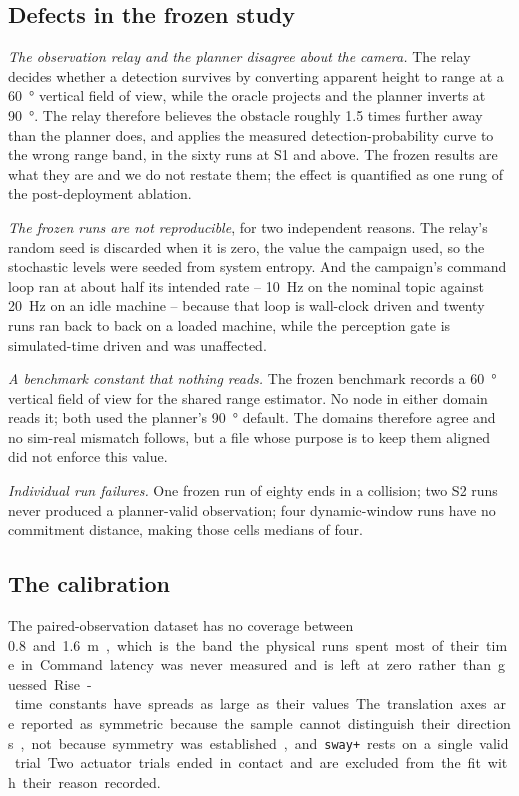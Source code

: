 \subsection{Defects in the frozen study}

\emph{The observation relay and the planner disagree about the camera.}
The relay decides whether a detection survives by converting apparent
height to range at a \SI{60}{\degree} vertical field of view, while the
oracle projects and the planner inverts at \SI{90}{\degree}. The relay
therefore believes the obstacle roughly \num{1.5} times further away
than the planner does, and applies the measured detection-probability
curve to the wrong range band, in the sixty runs at S1 and above. The
frozen results are what they are and we do not restate them; the effect
is quantified as one rung of the post-deployment ablation.

\emph{The frozen runs are not reproducible}, for two independent
reasons. The relay's random seed is discarded when it is zero, the value
the campaign used, so the stochastic levels were seeded from system
entropy. And the campaign's command loop ran at about half its intended
rate -- \SI{10}{\hertz} on the nominal topic against \SI{20}{\hertz} on
an idle machine -- because that loop is wall-clock driven and twenty runs
ran back to back on a loaded machine, while the perception gate is
simulated-time driven and was unaffected.

\emph{A benchmark constant that nothing reads.} The frozen benchmark
records a \SI{60}{\degree} vertical field of view for the shared range
estimator. No node in either domain reads it; both used the planner's
\SI{90}{\degree} default. The domains therefore agree and no sim-real
mismatch follows, but a file whose purpose is to keep them aligned did
not enforce this value.

\emph{Individual run failures.} One frozen run of eighty ends in a
collision; two S2 runs never produced a planner-valid observation; four
dynamic-window runs have no commitment distance, making those cells
medians of four.

\subsection{The calibration}

The paired-observation dataset has no coverage between \SI{0.8} and
\SI{1.6}{\metre}, which is the band the physical runs spent most of their
time in. Command latency was never measured and is left at zero rather
than guessed. Rise-time constants have spreads as large as their values.
The translation axes are reported as symmetric because the sample cannot
distinguish their directions, not because symmetry was established, and
\texttt{sway+} rests on a single valid trial. Two actuator trials ended
in contact and are excluded from the fit with their reason recorded.

